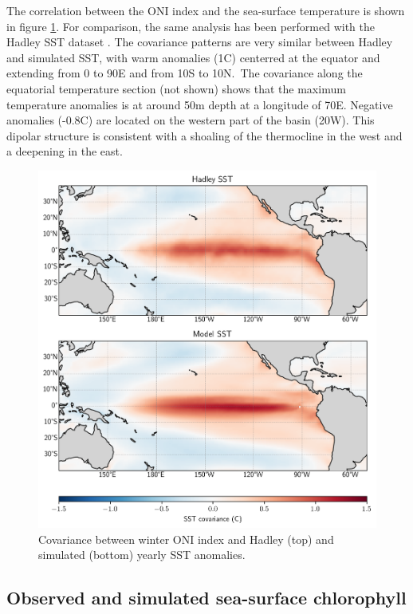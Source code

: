 The correlation between the ONI index and the sea-surface temperature is shown in figure \ref{fig:cov-sst}. For comparison, the same analysis has been performed with the Hadley SST dataset \citep{raynerGlobalAnalysesSea2003}.
The covariance patterns are very similar between Hadley and simulated SST, with warm anomalies (1\degree C) centerred at the equator and extending from 0 to 90\degree E and from 10\degree S to 10N.\ 
The covariance along the equatorial temperature section 
(not shown) shows that the maximum temperature anomalies is at around 50m depth at a longitude of 70\degree E. Negative anomalies (-0.8\degree C) are located on the western part of the basin (20\degree W). This dipolar structure is consistent with a shoaling of the thermocline in the west and a deepening in the east.\\

\begin{figure}[h!]
	\centering
	\includegraphics[scale=0.75] {figs/covariance_maps_hadley_model.png}
	\caption{Covariance between winter ONI index and Hadley (top) and simulated (bottom) yearly SST anomalies.}
	\label{fig:cov-sst}
\end{figure}

\subsection{Observed and simulated sea-surface chlorophyll}

